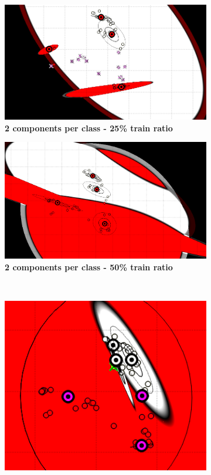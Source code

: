 \begin{figure} [ht]
\centering
	\begin{subfigure}[h]{0.40\textwidth}
    \centering
	\includegraphics[height=0.12\textheight]{./classification/gmm_2_25pourcent_full_var.png}
	\caption{\bf 2 components per class - 25\% train ratio}
	\end{subfigure}
    \hspace{20mm}
	\begin{subfigure}[h]{0.40\textwidth}
    \centering
	\includegraphics[height=0.12\textheight]{./classification/gmm_2_50pourcent_full_var.png}
	\caption{\bf 2 components per class - 50\% train ratio}
	\end{subfigure}\\
    \begin{subfigure}[h]{0.40\textwidth}
    \centering
    \includegraphics[height=0.12\textheight]{./classification/gmm_5_25pourcent_full_var.png}

\end{subfigure}
\end{figure}
